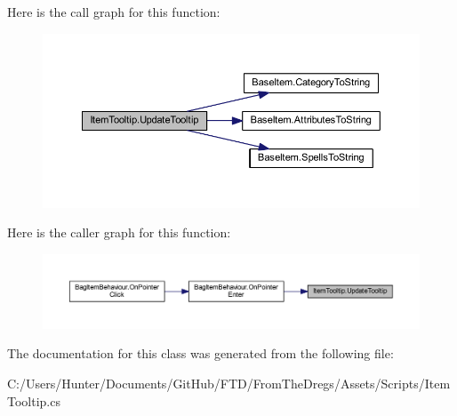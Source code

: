 Here is the call graph for this function\+:
\nopagebreak
\begin{figure}[H]
\begin{center}
\leavevmode
\includegraphics[width=350pt]{class_item_tooltip_a51e15cd0c208c14105cc8bedf452385b_cgraph}
\end{center}
\end{figure}
Here is the caller graph for this function\+:
\nopagebreak
\begin{figure}[H]
\begin{center}
\leavevmode
\includegraphics[width=350pt]{class_item_tooltip_a51e15cd0c208c14105cc8bedf452385b_icgraph}
\end{center}
\end{figure}


The documentation for this class was generated from the following file\+:\begin{DoxyCompactItemize}
\item 
C\+:/\+Users/\+Hunter/\+Documents/\+Git\+Hub/\+F\+T\+D/\+From\+The\+Dregs/\+Assets/\+Scripts/Item\+Tooltip.\+cs\end{DoxyCompactItemize}
